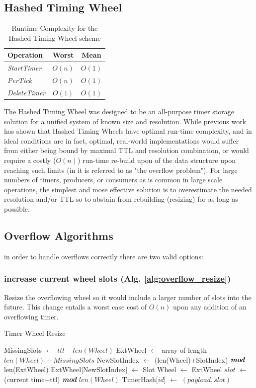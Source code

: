 \documentclass[conference]{IEEEtran}
\newcommand*\Let[2]{\State #1 $\gets$ #2}
\newcommand{\complexity}[9]{
\begin{table}[ht]
	\begin{center}
		\begin{tabular}{l|c|c}
			\textbf{Operation} & \textbf{#1} & \textbf{#2} \\
			\hline
			\textit{StartTimer} & $O(#3)$ & $O(#4)$ \\
			\textit{PerTick} & $O(#5)$ & $O(#6)$ \\
			\textit{DeleteTimer} &  $O(#7)$ & $O(#8)$ \\
		\end{tabular}
		\linebreak
		\caption{Runtime Complexity for #9}
	\end{center}
\end{table}
}
\begin{document}
\subsection{Hashed Timing Wheel}
\complexity{Worst}{Mean}{n}{1}{n}{1}{1}{1}{the Hashed Timing Wheel scheme}
The Hashed Timing Wheel was designed to be an all-purpose timer storage solution for a unified system of known size and resolution\cite{TW87, TW, TWI, largescale, autoscale}. While previous work has shown that Hashed Timing Wheels have optimal run-time complexity, and in ideal conditions are in fact, optimal, real-world implementations would suffer from either being bound by maximal TTL and resolution combination, or would require a costly ($O(n)$) run-time re-build upon of the data structure upon reaching such limits (in \cite{CQ} it is referred to as "the overflow problem"). For large numbers of timers, producers, or consumers as is common in large scale operations, the simplest and mose effective solution is to overestimate the needed resolution and/or TTL so to abstain from rebuilding (resizing) for as long as possible.

\subsection{Overflow Algorithms}
in order to handle overflows correctly there are two valid options:
\subsubsection{increase current wheel slots (Alg. \ref{alg:overflow_resize})} Resize the overflowing wheel so it would include a larger number of slots into the future. This change entails a worst case cost of $O(n)$ upon any addition of an overflowing timer.

\begin{algorithm}
	\caption{Timer Wheel Resize\label{alg:overflow_resize}}
	\begin{algorithmic}[1]
		\Let{MissingSlots}{$ttl-len(Wheel)$}
		\Let{ExtWheel}{array of length $len(Wheel) + MissingSlots$}
		\Let{NewSlotIndex}{(len(Wheel)+SlotIndex) $\textit{\textbf{mod}}$ len(ExtWheel) }
		\Let{ExtWheel[NewSlotIndex]}{Slot}
		\EndFor
		\Let{Wheel}{ExtWheel}
		\EndIf
		\Let{$slot$}{(current time+ttl) \textit{\textbf{mod}} $len(Wheel)$}
		\Let{TimerHash[$id$]}{$(payload,slot)$}
		\EndFunction
	\end{algorithmic}
\end{algorithm}
\end{document}
